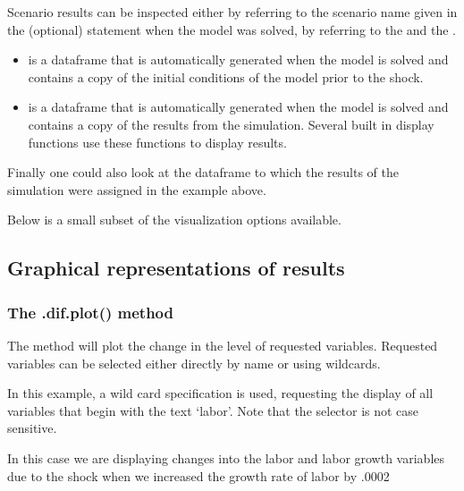 \documentclass[letterpaper,10pt,english]{jupyterBook}
\begin{document}
\sphinxAtStartPar
Scenario results can be inspected either by referring to the scenario name given in the (optional)  statement when the model was solved, by referring to the  and the .
\begin{itemize}
\item {} 
\sphinxAtStartPar
{} is a dataframe that is automatically generated when the model is solved and contains a copy of the initial conditions of the model prior to the shock.

\item {} 
\sphinxAtStartPar
{}is a dataframe that is automatically generated when the model is solved and contains a copy of the results from the simulation. Several built in display functions use these functions to display results.

\end{itemize}

\sphinxAtStartPar
Finally one could also look at the dataframe to which the results of the simulation were assigned  in the example above.

\sphinxAtStartPar
Below is a small sub\sphinxhyphen{}set of the visualization options available.


\subsection{Graphical representations of results}
\label{\detokenize{content/03_Installation/TestingModelFlow:graphical-representations-of-results}}

\subsubsection{The .dif.plot() method}
\label{\detokenize{content/03_Installation/TestingModelFlow:the-dif-plot-method}}
\sphinxAtStartPar
The  method will plot the change in the level of requested variables.  Requested variables can be selected either directly by name or using wildcards.

\sphinxAtStartPar
In this example, a wild card specification is used, requesting the display of all variables that begin with the text ‘labor’.  Note that the selector is not case sensitive.

\sphinxAtStartPar
In this case we are displaying changes into the labor and labor growth variables due to the shock when we increased the growth rate of labor by .0002
\end{document}
